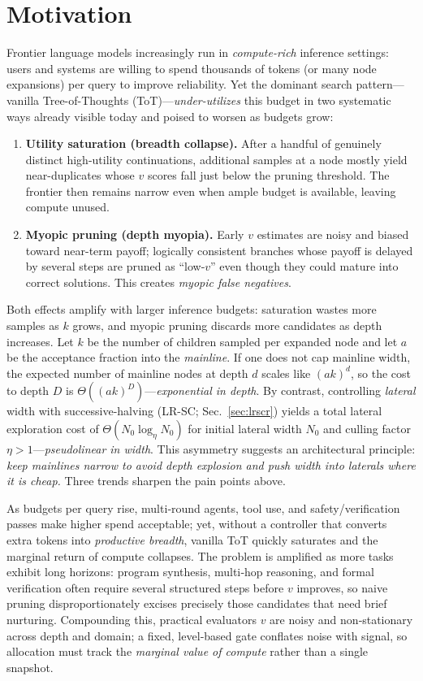 \documentclass{article}
\begin{document}
\section{Motivation}
\label{section:motivation}
Frontier language models increasingly run in \emph{compute-rich} inference settings:
users and systems are willing to spend thousands of tokens (or many node expansions) per query to improve reliability.
Yet the dominant search pattern—vanilla Tree-of-Thoughts (ToT)—\emph{under-utilizes} this budget in two systematic ways already visible today and poised to worsen as budgets grow:
\begin{enumerate}[leftmargin=*, itemsep=2pt, topsep=2pt]
    \item \textbf{Utility saturation (breadth collapse).} After a handful of genuinely distinct high-utility continuations, additional samples at a node mostly yield near-duplicates whose $v$ scores fall just below the pruning threshold. The frontier then remains narrow even when ample budget is available, leaving compute unused.
    \item \textbf{Myopic pruning (depth myopia).} Early $v$ estimates are noisy and biased toward near-term payoff; logically consistent branches whose payoff is delayed by several steps are pruned as ``low-$v$'' even though they could mature into correct solutions. This creates \emph{myopic false negatives}.
\end{enumerate}
Both effects amplify with larger inference budgets: saturation wastes more samples as $k$ grows, and myopic pruning discards more candidates as depth increases.
Let $k$ be the number of children sampled per expanded node and let $a$ be the acceptance fraction into the \emph{mainline}.
If one does not cap mainline width, the expected number of mainline nodes at depth $d$ scales like $(ak)^d$, so the cost to depth $D$ is $\Theta((ak)^D)$—\emph{exponential in depth}.
By contrast, controlling \emph{lateral} width with successive-halving (LR-SC; Sec.~\ref{sec:lrscr}) yields a total lateral exploration cost of $\Theta(N_0 \log_{\eta} N_0)$ for initial lateral width $N_0$ and culling factor $\eta>1$—\emph{pseudolinear in width}.
This asymmetry suggests an architectural principle:
\emph{keep mainlines narrow to avoid depth explosion and push width into laterals where it is cheap.}
Three trends sharpen the pain points above.

\noindent As budgets per query rise, multi‑round agents, tool use, and safety/verification passes make higher spend acceptable; yet, without a controller that converts extra tokens into \emph{productive breadth}, vanilla ToT quickly saturates and the marginal return of compute collapses. The problem is amplified as more tasks exhibit long horizons: program synthesis, multi‑hop reasoning, and formal verification often require several structured steps before $v$ improves, so naive pruning disproportionately excises precisely those candidates that need brief nurturing. Compounding this, practical evaluators $v$ are noisy and non‑stationary across depth and domain; a fixed, level‑based gate conflates noise with signal, so allocation must track the \emph{marginal value of compute} rather than a single snapshot.
\end{document}
